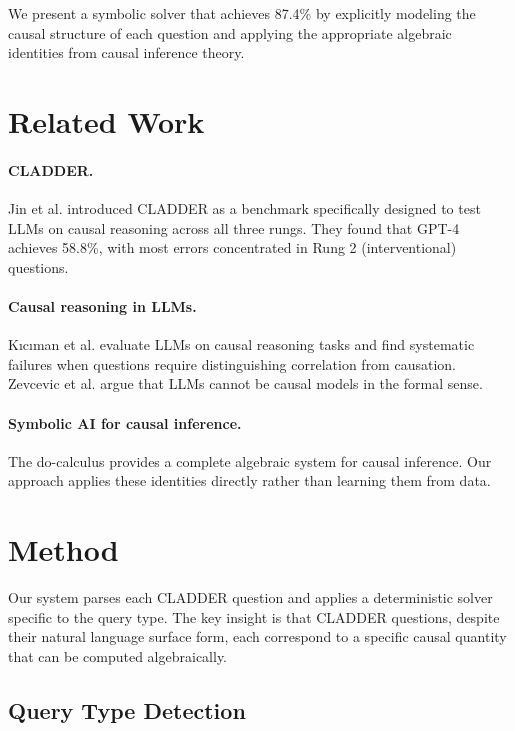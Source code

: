 \documentclass[11pt]{article}
\begin{document}
We present a symbolic solver that achieves 87.4\% by explicitly modeling
the causal structure of each question and applying the appropriate
algebraic identities from causal inference theory.

\section{Related Work}

\paragraph{CLADDER.} Jin et al. \cite{jin2023cladder} introduced CLADDER
as a benchmark specifically designed to test LLMs on causal reasoning
across all three rungs. They found that GPT-4 achieves 58.8\%, with most
errors concentrated in Rung 2 (interventional) questions.

\paragraph{Causal reasoning in LLMs.} K{\i}c{\i}man et al.
\cite{kiciman2023causal} evaluate LLMs on causal reasoning tasks and
find systematic failures when questions require distinguishing correlation
from causation. Zevcevic et al. \cite{zevcevic2023causal} argue that
LLMs cannot be causal models in the formal sense.

\paragraph{Symbolic AI for causal inference.} The do-calculus
\cite{pearl2009causality} provides a complete algebraic system for causal
inference. Our approach applies these identities directly rather than
learning them from data.

\section{Method}

Our system parses each CLADDER question and applies a deterministic
solver specific to the query type. The key insight is that CLADDER
questions, despite their natural language surface form, each correspond
to a specific causal quantity that can be computed algebraically.

\subsection{Query Type Detection}
\end{document}

